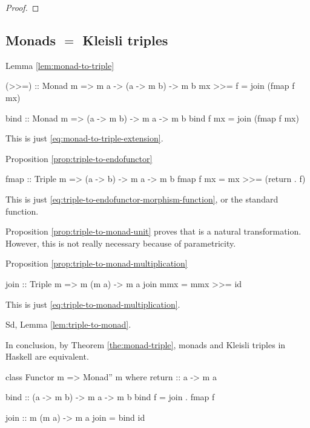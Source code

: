 \begin{example}
\begin{proof}
  \end{proof}

\end{example}

\subsection*{Monads $=$ Kleisli triples}

Lemma \ref{lem:monad-to-triple}

\begin{codehaskell}
(>>=) :: Monad m => m a -> (a -> m b) -> m b
mx >>= f = join (fmap f mx)
\end{codehaskell}

\begin{codehaskell}
bind :: Monad m => (a -> m b) -> m a -> m b
bind f mx = join (fmap f mx)
\end{codehaskell}
This is just \eqref{eq:monad-to-triple-extension}.

Proposition \ref{prop:triple-to-endofunctor}
\begin{codehaskell}
fmap :: Triple m => (a -> b) -> m a -> m b
fmap f mx = mx >>= (return . f)
\end{codehaskell}
This is just \eqref{eq:triple-to-endofunctor-morphism-function}, or
the standard  function.

Proposition \ref{prop:triple-to-monad-unit} proves that
 is a natural transformation. However, this is not
really necessary because of parametricity.

Proposition \ref{prop:triple-to-monad-multiplication}
\begin{codehaskell}
join :: Triple m => m (m a) -> m a
join mmx = mmx >>= id
\end{codehaskell}
This is just \eqref{eq:triple-to-monad-multiplication}.

Sd, Lemma \ref{lem:triple-to-monad}.

In conclusion, by Theorem \ref{the:monad-triple}, monads and Kleisli triples
in Haskell are equivalent.

\begin{codehaskell}
class Functor m => Monad'' m where
  return :: a -> m a

  bind :: (a -> m b) -> m a -> m b
  bind f = join . fmap f

  join :: m (m a) -> m a
  join = bind id
\end{codehaskell}

